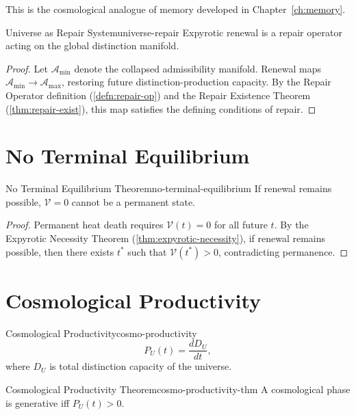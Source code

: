 \documentclass[12pt,twoside,openright]{book}
\begin{document}
This is the cosmological analogue of memory developed in
Chapter~\ref{ch:memory}.

\begin{theorem}{Universe as Repair System}{universe-repair}
  Expyrotic renewal is a repair operator acting on the
  global distinction manifold.
\end{theorem}

\begin{proof}
  Let $\mathcal{A}_{\min}$ denote the collapsed
  admissibility manifold. Renewal maps
  $\mathcal{A}_{\min} \to \mathcal{A}_{\max}$, restoring
  future distinction-production capacity. By the Repair
  Operator definition (\cref{defn:repair-op}) and the Repair
  Existence Theorem (\cref{thm:repair-exist}), this map
  satisfies the defining conditions of repair.
\end{proof}

\section{No Terminal Equilibrium}
\label{sec:ch19-no-terminal}

\begin{theorem}{No Terminal Equilibrium Theorem}{no-terminal-equilibrium}
  If renewal remains possible, $\mathcal{V} = 0$ cannot be
  a permanent state.
\end{theorem}

\begin{proof}
  Permanent heat death requires $\mathcal{V}(t) = 0$ for all
  future $t$. By the Expyrotic Necessity Theorem
  (\cref{thm:expyrotic-necessity}), if renewal remains
  possible, then there exists $t^*$ such that
  $\mathcal{V}(t^*) > 0$, contradicting permanence.
\end{proof}

\section{Cosmological Productivity}
\label{sec:ch19-productivity}

\begin{definition}{Cosmological Productivity}{cosmo-productivity}
  \[
    P_U(t) = \frac{dD_U}{dt},
  \]
  where $D_U$ is total distinction capacity of the
  universe.
\end{definition}

\begin{theorem}{Cosmological Productivity Theorem}{cosmo-productivity-thm}
  A cosmological phase is generative iff $P_U(t) > 0$.
\end{theorem}
\end{document}
